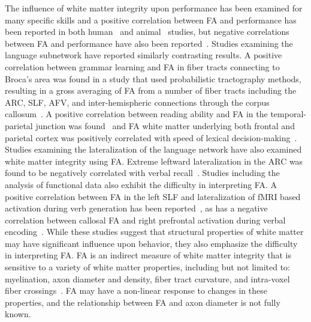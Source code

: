 \documentclass[final,authoryear,5p,times,twocolumn]{elsarticle}
\begin{document}
The influence of white matter integrity upon performance has been examined for many specific skills and a positive correlation between FA and performance has been reported in both human~\cite{Wolbers2006,Johansen-Berg2007} and animal~\cite{Makris2007} studies, but negative correlations between FA and performance have also been reported~\cite{Tuch2005,Hoeft2007}. Studies examining the language subnetwork have reported similarly contrasting results. A positive correlation between grammar learning and FA in fiber tracts connecting to Broca's area was found in a study that used probabilistic tractography methods, resulting in a gross averaging of FA from a number of fiber tracts including the ARC, SLF, AFV, and inter-hemispheric connections through the corpus callosum~\cite{Floel2009}. A positive correlation between reading ability and FA in the temporal-parietal junction was found~\cite{Klingberg2000} and FA white matter underlying both frontal and parietal cortex was positively correlated with speed of lexical decision-making~\cite{Gold2007}. Studies examining the lateralization of the language network have also examined white matter integrity using FA. Extreme leftward lateralization in the ARC was found to be negatively correlated with verbal recall~\cite{Catani2007}. Studies including the analysis of functional data also exhibit the difficulty in interpreting FA. A positive correlation between FA in the left SLF and lateralization of fMRI based activation during verb generation has been reported~\cite{Powell2006}, as has a negative correlation between callosal FA and right prefrontal activation during verbal encoding~\cite{Putnam2008}. While these studies suggest that structural properties of white matter may have significant influence upon behavior, they also emphasize the difficulty in interpreting FA. FA is an indirect measure of white matter integrity that is sensitive to a variety of white matter properties, including but not limited to: myelination, axon diameter and density, fiber tract curvature, and intra-voxel fiber crossings~\cite{Barkovich2000,Shimony1999,Virta1999}. FA may have a non-linear response to changes in these properties, and the relationship between FA and axon diameter is not fully known.  
\end{document}
